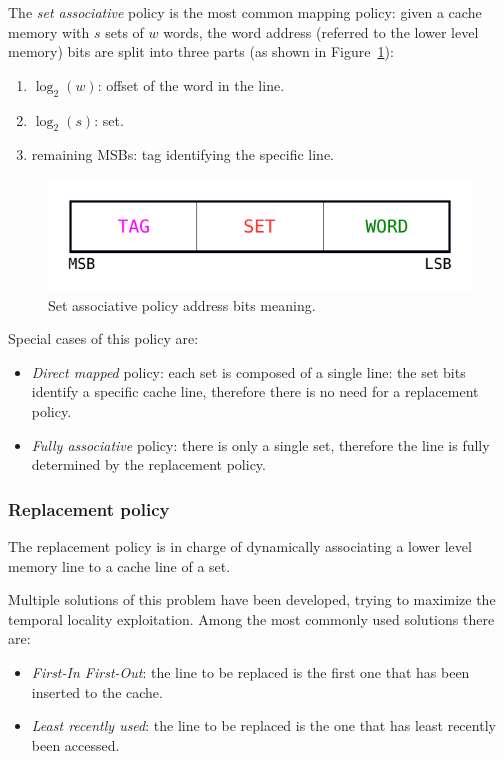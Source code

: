 \documentclass[11pt,a4paper]{memoir}
\begin{document}
The \emph{set associative} policy is the most common mapping policy: given a
cache memory with $s$ sets of $w$ words, the word address (referred to the lower
level memory) bits are split into three parts (as shown in
Figure~\ref{fig:address_partitioning}):
\begin{enumerate}
	\item $\log_2(w)$: offset of the word in the line.
	\item $\log_2(s)$: set.
	\item remaining MSBs: tag identifying the specific line.
\end{enumerate}

\begin{figure}
	\centering
	\includegraphics[width=.5\textwidth]{address_partitioning}
	\caption{Set associative policy address bits meaning.}
	\label{fig:address_partitioning}
\end{figure}

Special cases of this policy are:
\begin{itemize}
	\item \emph{Direct mapped} policy: each set is composed of a single line:
		the set bits identify a specific cache line, therefore there is
		no need for a replacement policy.
	\item \emph{Fully associative} policy: there is only a single set,
		therefore the line is fully determined by the replacement policy.
\end{itemize}

\subsubsection{Replacement policy}
The replacement policy is in charge of dynamically associating a lower level
memory line to a cache line of a set.

Multiple solutions of this problem have been developed, trying to maximize
the temporal locality exploitation.
Among the most commonly used solutions there are:
\begin{itemize}
	\item \emph{First-In First-Out}: the line to be replaced is the first
		one that has been inserted to the cache.
	\item \emph{Least recently used}: the line to be replaced is the one
		that has least recently been accessed.
\end{itemize}
\end{document}
